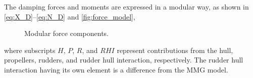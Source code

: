 
The damping forces and moments are expressed in a modular way, as shown in \autoref{eq:X_D}--\autoref{eq:N_D} and \autoref{fig:force_model},
\begin{equation}
    \label{eq:X_D}
    
\end{equation}
%
\begin{equation}
    \label{eq:Y_D}
    
\end{equation}
%
\begin{equation}
    \label{eq:N_D}
    
\end{equation}
%
\begin{figure}[h]
    \centering
    
    \caption{Modular force components.}
    \label{fig:force_model}
\end{figure}
where subscripts $H$, $P$, $R$, and $RHI$ represent contributions from the hull, propellers, rudders, and rudder hull interaction, respectively. The rudder hull interaction having its own element is a difference from the MMG model.